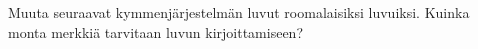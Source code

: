 \begin{tehtavasivu}
\begin{tehtava}
Muuta seuraavat kymmenjärjestelmän luvut roomalaisiksi luvuiksi. Kuinka monta merkkiä tarvitaan luvun kirjoittamiseen?
\begin{vastaus}
\end{vastaus}
\end{tehtava}

\end{tehtavasivu}
